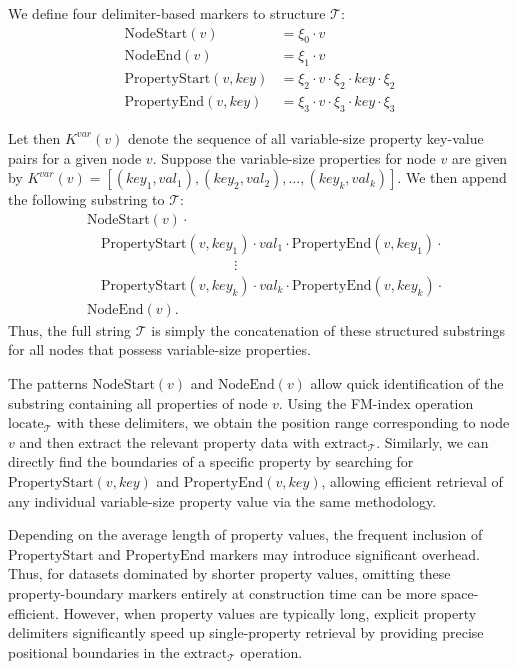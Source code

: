 We define four delimiter-based markers to structure \(\mathcal{T}\):
\begin{align*}
    \mathrm{NodeStart}(v) &= \xi_0 \cdot v \\
    \mathrm{NodeEnd}(v) &= \xi_1 \cdot v \\
    \mathrm{PropertyStart}(v, key) &= \xi_2 \cdot v \cdot \xi_2 \cdot key \cdot \xi_2 \\
    \mathrm{PropertyEnd}(v, key) &= \xi_3 \cdot v \cdot \xi_3 \cdot key \cdot \xi_3
\end{align*}

Let then \(K^{var}(v)\) denote the sequence of all variable-size property key-value pairs for a given node \(v\). Suppose the variable-size properties for node \(v\) are given by \(K^{var}(v) = [(key_1, val_1), (key_2, val_2), \dots, (key_k, val_k)]\). We then append the following substring to \(\mathcal{T}\):
\begin{align*}
& \mathrm{NodeStart}(v) \cdot \\
& \quad \mathrm{PropertyStart}(v, key_1) \cdot val_1 \cdot \mathrm{PropertyEnd}(v, key_1) \cdot \\
& \quad \hspace{4cm} \vdots \\
& \quad \mathrm{PropertyStart}(v, key_k) \cdot val_k \cdot \mathrm{PropertyEnd}(v, key_k) \cdot \\
& \mathrm{NodeEnd}(v).
\end{align*}
Thus, the full string \(\mathcal{T}\) is simply the concatenation of these structured substrings for all nodes that possess variable-size properties.

The patterns \(\mathrm{NodeStart}(v)\) and \(\mathrm{NodeEnd}(v)\) allow quick identification of the substring containing all properties of node \(v\). Using the FM-index operation \(\mathrm{locate}_{\mathcal T}\) with these delimiters, we obtain the position range corresponding to node \(v\) and then extract the relevant property data with \(\mathrm{extract}_{\mathcal T}\). Similarly, we can directly find the boundaries of a specific property by searching for \(\mathrm{PropertyStart}(v,key)\) and \(\mathrm{PropertyEnd}(v,key)\), allowing efficient retrieval of any individual variable-size property value via the same methodology.

Depending on the average length of property values, the frequent inclusion of \(\mathrm{PropertyStart}\) and \(\mathrm{PropertyEnd}\) markers may introduce significant overhead. Thus, for datasets dominated by shorter property values, omitting these property-boundary markers entirely at construction time can be more space-efficient. However, when property values are typically long, explicit property delimiters significantly speed up single-property retrieval by providing precise positional boundaries in the \(\mathrm{extract}_{\mathcal T}\) operation.